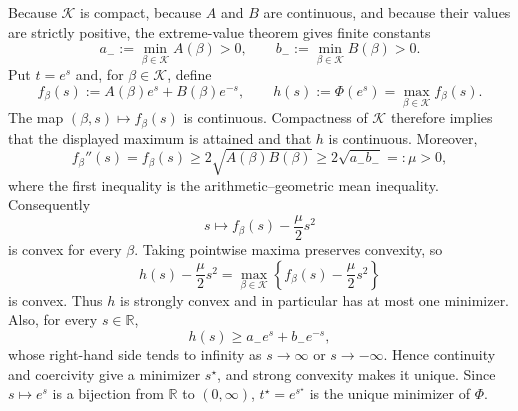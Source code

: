 Because \(\mathcal K\) is compact, because \(A\) and \(B\) are continuous, and because their values are strictly positive, the extreme-value theorem gives finite constants
\[
 a_-:=\min_{\beta\in\mathcal K}A(\beta)>0,
 \qquad
 b_-:=\min_{\beta\in\mathcal K}B(\beta)>0.
\]
Put \(t=e^s\) and, for \(\beta\in\mathcal K\), define
\[
 f_\beta(s):=A(\beta)e^s+B(\beta)e^{-s},
 \qquad
 h(s):=\Phi(e^s)=\max_{\beta\in\mathcal K}f_\beta(s).
\]
The map \((\beta,s)\mapsto f_\beta(s)\) is continuous.  Compactness of \(\mathcal K\) therefore implies that the displayed maximum is attained and that \(h\) is continuous.  Moreover,
\[
 f_\beta''(s)=f_\beta(s)
 \ge 2\sqrt{A(\beta)B(\beta)}
 \ge 2\sqrt{a_-b_-}=:\mu>0,
\]
where the first inequality is the arithmetic--geometric mean inequality.  Consequently
\[
 s\longmapsto f_\beta(s)-\frac{\mu}{2}s^2
\]
is convex for every \(\beta\).  Taking pointwise maxima preserves convexity, so
\[
 h(s)-\frac{\mu}{2}s^2
 =\max_{\beta\in\mathcal K}
 \left\{f_\beta(s)-\frac{\mu}{2}s^2\right\}
\]
is convex.  Thus \(h\) is strongly convex and in particular has at most one minimizer.  Also, for every \(s\in\mathbb R\),
\[
 h(s)\ge a_-e^s+b_-e^{-s},
\]
whose right-hand side tends to infinity as \(s\to\infty\) or \(s\to-\infty\).  Hence continuity and coercivity give a minimizer \(s^\star\), and strong convexity makes it unique.  Since \(s\mapsto e^s\) is a bijection from \(\mathbb R\) to \((0,\infty)\), \(t^\star=e^{s^\star}\) is the unique minimizer of \(\Phi\).

